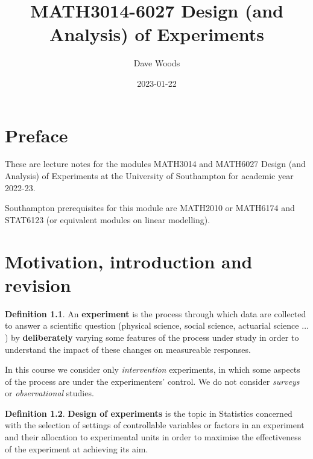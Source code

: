 \documentclass[
]{book}
\title{MATH3014-6027 Design (and Analysis) of Experiments}
\author{Dave Woods}
\date{2023-01-22}
\theoremstyle{definition}
\newtheorem{definition}{Definition}[chapter]
\theoremstyle{definition}
\theoremstyle{definition}
\theoremstyle{definition}
\theoremstyle{remark}
\begin{document}
\maketitle

{
\setcounter{tocdepth}{1}
\tableofcontents
}
\hypertarget{preface}{%
\chapter*{Preface}\label{preface}}

These are lecture notes for the modules MATH3014 and MATH6027 Design (and Analysis) of Experiments at the University of Southampton for academic year 2022-23.

Southampton prerequisites for this module are MATH2010 or MATH6174 and STAT6123 (or equivalent modules on linear modelling).

\newcommand{\bx}{\boldsymbol{x}}
\newcommand{\btheta}{\boldsymbol{\theta}}
\newcommand{\bbeta}{\boldsymbol{\beta}}
\newcommand{\bvarepsilon}{\boldsymbol{\varepsilon}}
\newcommand{\by}{\boldsymbol{y}}
\newcommand{\rT}{\mathrm{T}}
\newcommand{\Var}{\operatorname{Var}}
\newcommand{\bY}{\boldsymbol{y}}
\newcommand{\btau}{\boldsymbol{\tau}}

\hypertarget{intro}{%
\chapter{Motivation, introduction and revision}\label{intro}}

\begin{definition}
\protect\hypertarget{def:exp}{}\label{def:exp}An \textbf{experiment} is the process through which data are collected to answer a scientific question (physical science, social science, actuarial science \(\dots\)) by \textbf{deliberately} varying some features of the process under study in order to understand the impact of these changes on measureable responses.

In this course we consider only \emph{intervention} experiments, in which some aspects of the process are under the experimenters' control. We do not consider \emph{surveys} or \emph{observational} studies.
\end{definition}

\begin{definition}
\protect\hypertarget{def:design}{}\label{def:design}\textbf{Design of experiments} is the topic in Statistics concerned with the selection of settings of controllable variables or factors in an experiment and their allocation to experimental units in order to maximise the effectiveness of the experiment at achieving its aim.
\end{definition}
\end{document}
